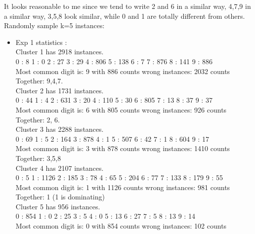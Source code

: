 \documentclass[paper=a4, fontsize=11pt]{scrartcl} %
\numberwithin{equation}{section} %
\numberwithin{figure}{section} %
\numberwithin{table}{section} %
\begin{document}
It looks reasonable to me since we tend to write 2 and 6 in a similar way, 4,7,9 in a similar way, 3,5,8 look similar, while 0 and 1 are totally different from others. \\

Randomly sample k=5 instances: \\
\begin{itemize}
	\item Exp 1 statistics :  \\
	
Cluster 1 has 2918 instances. \\
0 : 8	1 : 0	2 : 27	3 : 29	4 : 806	5 : 138	6 : 7	7 : 876	8 : 141	9 : 886	\\
Most common digit is: 9 with 886 counts	wrong instances: 2032 counts\\

Together: 9,4,7.\\

Cluster 2 has 1731 instances. \\
0 : 44	1 : 4	2 : 631	3 : 20	4 : 110	5 : 30	6 : 805	7 : 13	8 : 37	9 : 37	\\
Most common digit is: 6 with 805 counts	wrong instances: 926 counts\\

Together: 2, 6.\\

Cluster 3 has 2288 instances. \\
0 : 69	1 : 5	2 : 164	3 : 878	4 : 1	5 : 507	6 : 42	7 : 1	8 : 604	9 : 17	\\
Most common digit is: 3 with 878 counts	wrong instances: 1410 counts\\

Together: 3,5,8\\

Cluster 4 has 2107 instances. \\
0 : 5	1 : 1126	2 : 185	3 : 78	4 : 65	5 : 204	6 : 77	7 : 133	8 : 179	9 : 55	\\
Most common digit is: 1 with 1126 counts	wrong instances: 981 counts\\

Together: 1 (1 is dominating)\\

Cluster 5 has 956 instances. \\
0 : 854	1 : 0	2 : 25	3 : 5	4 : 0	5 : 13	6 : 27	7 : 5	8 : 13	9 : 14	\\
Most common digit is: 0 with 854 counts	wrong instances: 102 counts\\


\end{itemize}
\end{document}
